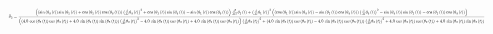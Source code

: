 \begin{equation}\label{ddtheta2}
\scalemath{0.3}{\ddot{\theta}{_2} =	
{\frac { \left(  \left( \sin \left( \theta_{{3}} \left( t \right) 
 \right) \sin \left( \theta_{{1}} \left( t \right)  \right) +\cos
 \left( \theta_{{1}} \left( t \right)  \right) \cos \left( \theta_{{3}
} \left( t \right)  \right)  \right)  \left( {\frac {\rm d}{{\rm d}t}}
\theta_{{3}} \left( t \right)  \right) ^{2}+\cos \left( \theta_{{1}}
 \left( t \right)  \right) \sin \left( \theta_{{3}} \left( t \right) 
 \right) -\sin \left( \theta_{{1}} \left( t \right)  \right) \cos
 \left( \theta_{{3}} \left( t \right)  \right)  \right) {\frac {
{\rm d}^{2}}{{\rm d}{t}^{2}}}\theta_{{1}} \left( t \right) + \left( {
\frac {\rm d}{{\rm d}t}}\theta_{{1}} \left( t \right)  \right) ^{2}
 \left(  \left( \cos \left( \theta_{{1}} \left( t \right)  \right) 
\sin \left( \theta_{{3}} \left( t \right)  \right) -\sin \left( \theta
_{{1}} \left( t \right)  \right) \cos \left( \theta_{{3}} \left( t
 \right)  \right)  \right)  \left( {\frac {\rm d}{{\rm d}t}}\theta_{{3
}} \left( t \right)  \right) ^{2}-\sin \left( \theta_{{3}} \left( t
 \right)  \right) \sin \left( \theta_{{1}} \left( t \right)  \right) -
\cos \left( \theta_{{1}} \left( t \right)  \right) \cos \left( \theta_
{{3}} \left( t \right)  \right)  \right) }{ \left(  \left(  4.0\,\cos
 \left( \theta_{{3}} \left( t \right)  \right) \cos \left( \theta_{{2}
} \left( t \right)  \right) + 4.0\,\sin \left( \theta_{{2}} \left( t
 \right)  \right) \sin \left( \theta_{{3}} \left( t \right)  \right) 
 \right)  \left( {\frac {\rm d}{{\rm d}t}}\theta_{{2}} \left( t
 \right)  \right) ^{2}- 4.0\,\sin \left( \theta_{{3}} \left( t
 \right)  \right) \cos \left( \theta_{{2}} \left( t \right)  \right) +
 4.0\,\sin \left( \theta_{{2}} \left( t \right)  \right) \cos \left( 
\theta_{{3}} \left( t \right)  \right)  \right)  \left( {\frac {\rm d}
{{\rm d}t}}\theta_{{3}} \left( t \right)  \right) ^{2}+ \left(  4.0\,
\sin \left( \theta_{{3}} \left( t \right)  \right) \cos \left( \theta_
{{2}} \left( t \right)  \right) - 4.0\,\sin \left( \theta_{{2}}
 \left( t \right)  \right) \cos \left( \theta_{{3}} \left( t \right) 
 \right)  \right)  \left( {\frac {\rm d}{{\rm d}t}}\theta_{{2}}
 \left( t \right)  \right) ^{2}+ 4.0\,\cos \left( \theta_{{3}} \left( 
t \right)  \right) \cos \left( \theta_{{2}} \left( t \right)  \right) 
+ 4.0\,\sin \left( \theta_{{2}} \left( t \right)  \right) \sin \left( 
\theta_{{3}} \left( t \right)  \right) }}
}
\end{equation}


